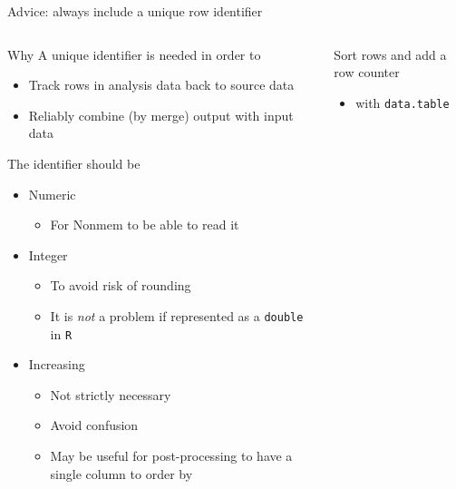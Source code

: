 \documentclass[
  8pt,
  ignorenonframetext,
  aspectratio=169]{beamer}
\providecommand{\tightlist}{%
  \setlength{\itemsep}{0pt}\setlength{\parskip}{0pt}}
\begin{document}
\begin{frame}[fragile]{Advice: always include a unique row identifier}
\protect\hypertarget{advice-always-include-a-unique-row-identifier}{}
\begin{columns}[T]
\begin{column}{0.48\textwidth}
\begin{block}{Why}
\protect\hypertarget{why}{}
A unique identifier is needed in order to

\begin{itemize}
\item
  Track rows in analysis data back to source data
\item
  Reliably combine (by merge) output with input data
\end{itemize}
\end{block}

\begin{block}{The identifier should be}
\protect\hypertarget{the-identifier-should-be}{}
\begin{itemize}
\tightlist
\item
  Numeric

  \begin{itemize}
  \tightlist
  \item
    For Nonmem to be able to read it
  \end{itemize}
\item
  Integer

  \begin{itemize}
  \tightlist
  \item
    To avoid risk of rounding
  \item
    It is \emph{not} a problem if represented as a \texttt{double} in
    \texttt{R}
  \end{itemize}
\item
  Increasing

  \begin{itemize}
  \tightlist
  \item
    Not strictly necessary
  \item
    Avoid confusion
  \item
    May be useful for post-processing to have a single column to order
    by
  \end{itemize}
\end{itemize}
\end{block}
\end{column}

\begin{column}{0.48\textwidth}
\begin{block}{Sort rows and add a row counter}
\protect\hypertarget{sort-rows-and-add-a-row-counter}{}
\begin{itemize}
\tightlist
\item
  with \texttt{data.table}
\end{itemize}


\end{block}
\end{column}
\end{columns}
\end{frame}
\end{document}
